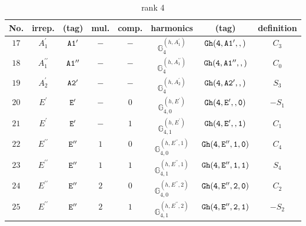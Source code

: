 \documentclass[fleqn,8pt]{jsarticle}
\begin{document}
\begin{table}[ht!]
\begin{center}
\caption{rank 4}
\renewcommand{\arraystretch}{1.3}
\begin{tabular}{cccccccc} \hline \hline
No. & irrep. & (tag) & mul. & comp. & harmonics & (tag) & definition \\ \hline
$ 17 $ & $ A_{1}^{\prime} $ & $ {\tt A1'} $ & $ - $ & $ - $ & $ \mathbb{G}_{4}^{(h,A_{1}^{\prime})} $ & $ {\tt Gh(4,A1',,)} $ & $ C_{3} $ \\
$ 18 $ & $ A_{1}^{\prime\prime} $ & $ {\tt A1''} $ & $ - $ & $ - $ & $ \mathbb{G}_{4}^{(h,A_{1}^{\prime\prime})} $ & $ {\tt Gh(4,A1'',,)} $ & $ C_{0} $ \\
$ 19 $ & $ A_{2}^{\prime} $ & $ {\tt A2'} $ & $ - $ & $ - $ & $ \mathbb{G}_{4}^{(h,A_{2}^{\prime})} $ & $ {\tt Gh(4,A2',,)} $ & $ S_{3} $ \\
$ 20 $ & $ E^{\prime} $ & $ {\tt E'} $ & $ - $ & $ 0 $ & $ \mathbb{G}_{4,0}^{(h,E^{\prime})} $ & $ {\tt Gh(4,E',,0)} $ & $ - S_{1} $ \\
$ 21 $ & $ E^{\prime} $ & $ {\tt E'} $ & $ - $ & $ 1 $ & $ \mathbb{G}_{4,1}^{(h,E^{\prime})} $ & $ {\tt Gh(4,E',,1)} $ & $ C_{1} $ \\
$ 22 $ & $ E^{\prime\prime} $ & $ {\tt E''} $ & $ 1 $ & $ 0 $ & $ \mathbb{G}_{4,0}^{(h,E^{\prime\prime},1)} $ & $ {\tt Gh(4,E'',1,0)} $ & $ C_{4} $ \\
$ 23 $ & $ E^{\prime\prime} $ & $ {\tt E''} $ & $ 1 $ & $ 1 $ & $ \mathbb{G}_{4,1}^{(h,E^{\prime\prime},1)} $ & $ {\tt Gh(4,E'',1,1)} $ & $ S_{4} $ \\
$ 24 $ & $ E^{\prime\prime} $ & $ {\tt E''} $ & $ 2 $ & $ 0 $ & $ \mathbb{G}_{4,0}^{(h,E^{\prime\prime},2)} $ & $ {\tt Gh(4,E'',2,0)} $ & $ C_{2} $ \\
$ 25 $ & $ E^{\prime\prime} $ & $ {\tt E''} $ & $ 2 $ & $ 1 $ & $ \mathbb{G}_{4,1}^{(h,E^{\prime\prime},2)} $ & $ {\tt Gh(4,E'',2,1)} $ & $ - S_{2} $ \\
 \hline \hline
\end{tabular}
\end{center}
\end{table}
\end{document}
